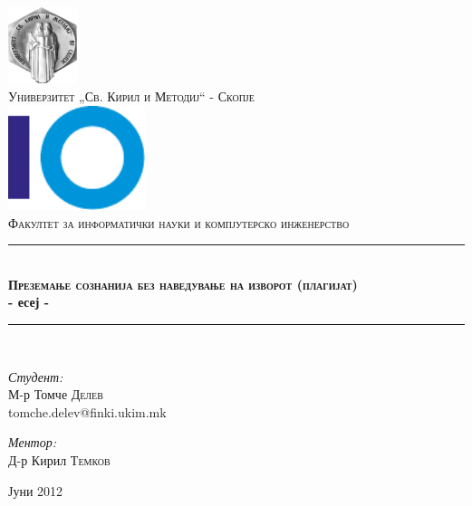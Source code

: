 \begin{titlepage}
\begin{center}
\newcommand{\HRule}{\rule{\linewidth}{0.5mm}}

\includegraphics[width=0.15\textwidth]{images/ukim}\\[1cm]
\textsc{\large Универзитет „Св. Кирил и Методиј“ - Скопје}\\[1.5cm]

\includegraphics[width=0.3\textwidth]{images/finki_logo}\\[1cm]
\textsc{\large Факултет за информатички науки и компјутерско
инженерство}\\[1.5cm]

\HRule \\[0.4cm]
{  \bfseries \textsc{Преземање сознанија без наведување на изворот (плагијат)} \\[0.4cm] - есеј
-}
\\[0.4cm]

\HRule \\[1.5cm]

\begin{minipage}{0.45\textwidth}
\begin{flushleft} 
\emph{Студент:}\\
М-р Томче \textsc{Делев}\\
tomche.delev@finki.ukim.mk
\end{flushleft}
\end{minipage}
\begin{minipage}{0.45\textwidth}
\begin{flushright} 
\emph{Ментор:} \\
Д-р Кирил \textsc{Темков}
\end{flushright}
\end{minipage}

\vfill

{\large Јуни 2012}

\end{center}
\end{titlepage}